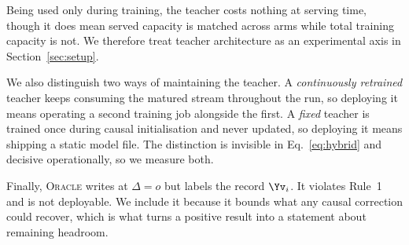 Being used only during training, the teacher costs nothing at serving time, though it does mean
served capacity is matched across arms while total training capacity is not. We therefore treat
teacher architecture as an experimental axis in Section~\ref{sec:setup}.

We also distinguish two ways of maintaining the teacher. A \emph{continuously retrained} teacher
keeps consuming the matured stream throughout the run, so deploying it means operating a second
training job alongside the first. A \emph{fixed} teacher is trained once during causal
initialisation and never updated, so deploying it means shipping a static model file. The
distinction is invisible in Eq.~\eqref{eq:hybrid} and decisive operationally, so we measure
both.

Finally, \textsc{Oracle} writes at $\Delta=o$ but labels the record $\Yv_i$. It violates Rule~1
and is not deployable. We include it because it bounds what any causal correction could recover,
which is what turns a positive result into a statement about remaining headroom.
